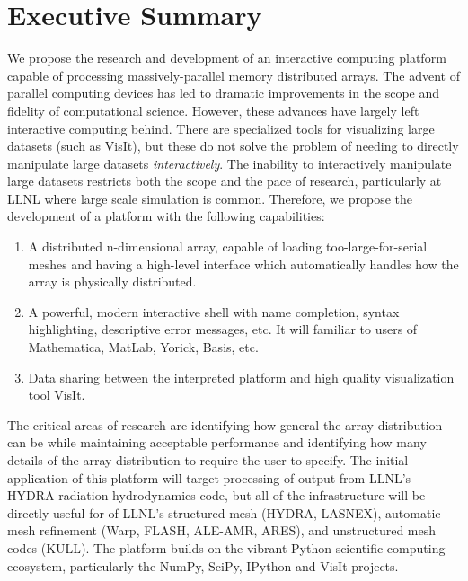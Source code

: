 \documentclass[letterpaper,12pt]{article}
\begin{document}


\setlength{\parindent}{15pt}

\section*{Executive Summary }
We propose the research and development of an interactive computing platform capable of processing massively-parallel memory distributed arrays.  The advent of parallel computing devices has led to dramatic improvements in the scope and fidelity of computational science.  However, these advances have largely left interactive computing behind.  There are specialized tools for visualizing large datasets (such as VisIt\cite{VisIt}), but these do not solve the problem of needing to directly manipulate large datasets \emph{interactively}.  The inability to interactively manipulate large datasets restricts both the scope and the pace of research, particularly at LLNL where large scale simulation is common.  Therefore, we propose the development of a platform with the following capabilities:

\begin{enumerate}
	\item A distributed n-dimensional array, capable of loading too-large-for-serial meshes 
          and having a high-level interface which automatically handles how 
          the array is physically distributed.

	\item A powerful, modern interactive shell with name completion, syntax highlighting, 
		descriptive error messages, etc.  It will familiar to users of Mathematica, 
		MatLab, Yorick, Basis, etc.

	\item Data sharing between the interpreted platform and high quality visualization tool VisIt.
\end{enumerate}

The critical areas of research are identifying how general the array distribution can be 
while maintaining acceptable performance and identifying how many details of the array 
distribution to require the user to specify.  The initial application of this platform 
will target processing of output from LLNL's HYDRA\cite{Marinak2001} radiation-hydrodynamics 
code, but all of the infrastructure will be directly useful for of LLNL's structured mesh 
(HYDRA, LASNEX\cite{Zimmerman1977}), automatic mesh refinement
(Warp\cite{Grote2005}, FLASH\cite{flash}, ALE-AMR\cite{Koniges2010}, ARES\cite{needed}),
and unstructured mesh codes (KULL\cite{Rathkopf2000}).  The platform builds on the vibrant
Python scientific computing ecosystem, particularly the NumPy\cite{Oliphant2006}, 
SciPy\cite{numpyscipy}, IPython\cite{ipython} and VisIt projects.
\end{document}
